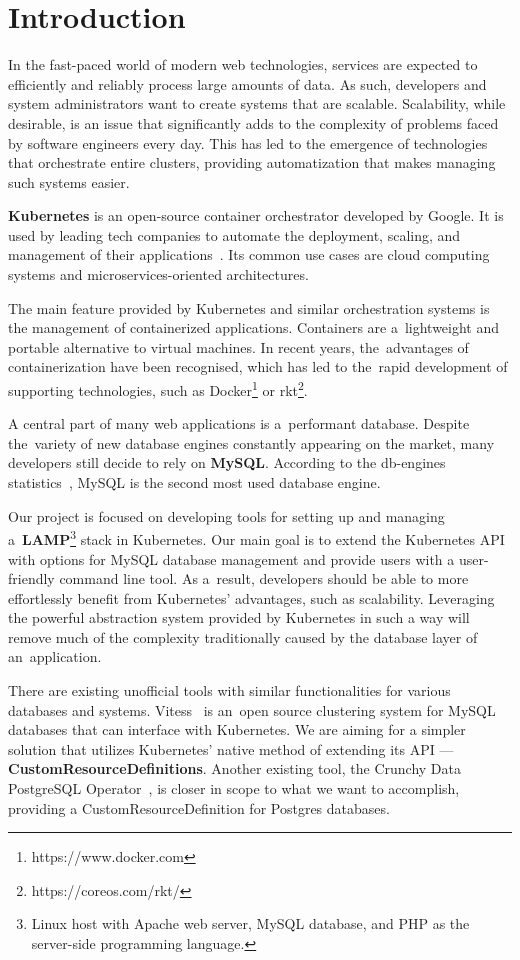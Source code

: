 \chapter{Introduction}
In the fast-paced world of modern web technologies, services are expected to
efficiently and reliably process large amounts of data. As such, developers
and system administrators want to create systems that are scalable. Scalability,
while desirable, is an issue that significantly adds to the complexity of
problems faced by software engineers every day. This has led to the emergence of
technologies that orchestrate entire clusters, providing automatization that
makes managing such systems easier.

\textbf{Kubernetes} is an open-source container orchestrator developed by
Google. It is used by leading tech companies to automate the deployment,
scaling, and management of their applications~\cite{kube-usecase}. Its common
use cases are cloud computing systems and microservices-oriented architectures.

The main feature provided by Kubernetes and similar orchestration
systems is the management of containerized applications. Containers are
a~lightweight and portable alternative to virtual machines. In recent years,
the~advantages of containerization have been recognised, which has led to
the~rapid development of supporting technologies, such as Docker\footnote{https://www.docker.com}
or rkt\footnote{https://coreos.com/rkt/}.

A central part of many web applications is a~performant database. Despite
the~variety of new database engines constantly appearing on the market, many
developers still decide to rely on \textbf{MySQL}. According to the db-engines
statistics~\cite{db-eng}, MySQL is the second most used database
engine.

Our project is focused on developing tools for setting up and managing
a~\textbf{LAMP}\footnote{Linux host with Apache web server, MySQL database,
and PHP as the server-side programming language.} stack in Kubernetes. Our main goal is to
extend the Kubernetes API with options for MySQL database
management and provide users with a user-friendly command line tool. As
a~result, developers should be able to more effortlessly benefit from
Kubernetes’ advantages, such as scalability. Leveraging the powerful
abstraction system provided by Kubernetes in such a way will remove
much of the complexity traditionally caused by the database layer of
an~application.

There are existing unofficial tools with similar functionalities for various
databases and systems. Vitess~\cite{vitess} is an~open source
clustering system for MySQL databases that can interface with
Kubernetes. We are aiming for a simpler solution that utilizes
Kubernetes' native method of extending its API ---
\textbf{CustomResourceDefinitions}. Another existing tool,
the Crunchy Data PostgreSQL Operator~\cite{psql-op}, is closer in scope to what we want to
accomplish, providing a CustomResourceDefinition for Postgres databases.

